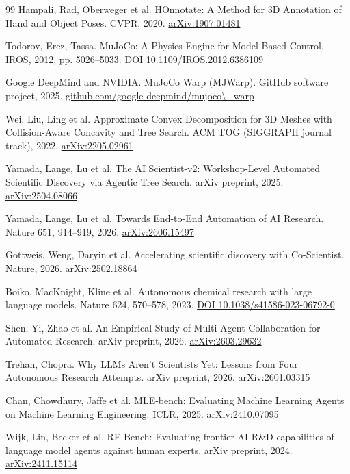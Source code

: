 \documentclass[11pt]{article}
\begin{document}
\begin{thebibliography}{99}
 Hampali, Rad, Oberweger et al. HOnnotate: A Method for 3D Annotation of Hand and Object Poses. CVPR, 2020. \href{https://arxiv.org/abs/1907.01481}{arXiv:1907.01481}

 Todorov, Erez, Tassa. MuJoCo: A Physics Engine for Model-Based Control. IROS, 2012, pp. 5026–5033. \href{https://doi.org/10.1109/IROS.2012.6386109}{DOI 10.1109/IROS.2012.6386109}

 Google DeepMind and NVIDIA. MuJoCo Warp (MJWarp). GitHub software project, 2025. \href{https://github.com/google-deepmind/mujoco_warp}{github.com/google-deepmind/mujoco\textbackslash{}\_warp}

 Wei, Liu, Ling et al. Approximate Convex Decomposition for 3D Meshes with Collision-Aware Concavity and Tree Search. ACM TOG (SIGGRAPH journal track), 2022. \href{https://arxiv.org/abs/2205.02961}{arXiv:2205.02961}

 Yamada, Lange, Lu et al. The AI Scientist-v2: Workshop-Level Automated Scientific Discovery via Agentic Tree Search. arXiv preprint, 2025. \href{https://arxiv.org/abs/2504.08066}{arXiv:2504.08066}

 Yamada, Lange, Lu et al. Towards End-to-End Automation of AI Research. Nature 651, 914–919, 2026. \href{https://arxiv.org/abs/2606.15497}{arXiv:2606.15497}

 Gottweis, Weng, Daryin et al. Accelerating scientific discovery with Co-Scientist. Nature, 2026. \href{https://arxiv.org/abs/2502.18864}{arXiv:2502.18864}

 Boiko, MacKnight, Kline et al. Autonomous chemical research with large language models. Nature 624, 570–578, 2023. \href{https://doi.org/10.1038/s41586-023-06792-0}{DOI 10.1038/s41586-023-06792-0}

 Shen, Yi, Zhao et al. An Empirical Study of Multi-Agent Collaboration for Automated Research. arXiv preprint, 2026. \href{https://arxiv.org/abs/2603.29632}{arXiv:2603.29632}

 Trehan, Chopra. Why LLMs Aren't Scientists Yet: Lessons from Four Autonomous Research Attempts. arXiv preprint, 2026. \href{https://arxiv.org/abs/2601.03315}{arXiv:2601.03315}

 Chan, Chowdhury, Jaffe et al. MLE-bench: Evaluating Machine Learning Agents on Machine Learning Engineering. ICLR, 2025. \href{https://arxiv.org/abs/2410.07095}{arXiv:2410.07095}

 Wijk, Lin, Becker et al. RE-Bench: Evaluating frontier AI R\&D capabilities of language model agents against human experts. arXiv preprint, 2024. \href{https://arxiv.org/abs/2411.15114}{arXiv:2411.15114}


\end{thebibliography}
\end{document}
